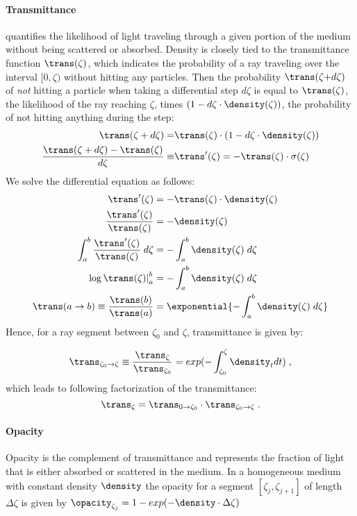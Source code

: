 \paragraph{Transmittance} quantifies the likelihood of light traveling through a given portion of the medium without being scattered or absorbed. Density is closely tied to the transmittance function $\trans(\zeta)$, which indicates the probability of a ray traveling over the interval $[0, \zeta)$ without hitting any particles. Then the probability $\trans(\zeta {+} d\zeta)$ of \emph{not} hitting a particle when taking a differential step $d\zeta$ is equal to $\trans(\zeta)$, the likelihood of the ray reaching $\zeta$, times $(1 - d\zeta \cdot \density(\zeta))$, the probability of not hitting anything during the step:
% 
\begin{align}
\trans(\zeta+d\zeta) =& \trans(\zeta) \cdot (1 - d\zeta \cdot \density(\zeta))
\\
\frac{\trans(\zeta+d\zeta) - \trans(\zeta)}{d\zeta} \equiv& \trans'(\zeta) = -\trans(\zeta) \cdot \sigma(\zeta) 
\label{eq:derivative}
\end{align}
% 
We solve the differential equation as follows:
%
\begin{align}
\trans'(\zeta) &= -\trans(\zeta) \cdot \density(\zeta) \\
\frac{\trans'(\zeta)}{\trans(\zeta)} &= -\density(\zeta) \\
\int_a^b \frac{\trans'(\zeta)}{\trans(\zeta)} \; d\zeta &= -\int_a^b \density(\zeta) \; d\zeta \\
\left. \log \trans(\zeta) \right|_a^b &= -\int_a^b \density(\zeta) \; d\zeta \\
\trans(a \rightarrow b) \equiv \frac{\trans(b)}{\trans(a)} &= \exponential{-\int_a^b \density(\zeta) \; d\zeta}   
\end{align}
% 
Hence, for a ray segment between $\zeta_0$ and $\zeta$, transmittance is given by:

\begin{equation}
\trans_{\zeta_0 \rightarrow \zeta} \equiv \frac{\trans_{\zeta}}{\trans_{\zeta_0}} = exp({-\int_{\zeta_0}^\zeta \density_t dt})\;,
\label{eq:trans_ab}
\end{equation}
which leads to following factorization of the transmittance:
\begin{equation}
\trans_{\zeta} = \trans_{0 \rightarrow \zeta_0} \cdot \trans_{\zeta_0 \rightarrow \zeta}\;.
\label{eq:factor}
\end{equation}

\paragraph{Opacity}Opacity is the complement of transmittance and represents the fraction of light that is either absorbed or scattered in the medium. In a homogeneous medium with constant density $\density$  the opacity for a segment $[\zeta_j, \zeta_{j+1}]$ of length $\Delta \zeta$ is given by $\opacity_{\zeta_j} = 1 - exp(-\density \cdot \Delta \zeta)$
